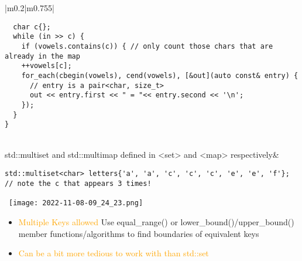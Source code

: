\documentclass[main.tex,fontsize=8pt,paper=a4,paper=portrait,DIV=calc,]{scrartcl}
\begin{document}
\begin{table}[ht!]
\begin{tabular}{|m{0.2\linewidth}|m{0.755\linewidth}|}
\begin{lstlisting}
  char c{};
  while (in >> c) {
    if (vowels.contains(c)) { // only count those chars that are already in the map
    ++vowels[c];
    for_each(cbegin(vowels), cend(vowels), [&out](auto const& entry) {
      // entry is a pair<char, size_t>
      out << entry.first << " = "<< entry.second << '\n';
    });
  }
}
\end{lstlisting}\\
\hline
std::multiset and std::multimap \newline
defined in <set> and <map> respectively& 
\begin{lstlisting}
std::multiset<char> letters{'a', 'a', 'c', 'c', 'c', 'e', 'e', 'f'};
// note the c that appears 3 times!
\end{lstlisting}
\, \newline
\texttt{[image: 2022-11-08-09\_24\_23.png]}\newline
\begin{itemize}
\item \textcolor{orange}{Multiple Keys allowed}\newline
  Use equal\_range() or lower\_bound()/upper\_bound() member functions/algorithms to find boundaries of equivalent keys
\item \textcolor{orange}{Can be a bit more tedious to work with than std::set}
\vspace{-2mm}
\end{itemize} \\
\hline
\end{tabular}
\end{table}
\pagebreak
\end{document}
